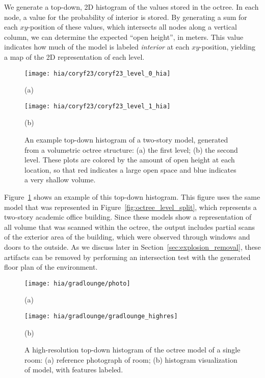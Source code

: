 \documentclass[12pt,onecolumn,oneside]{book}
\begin{document}
We generate a top-down, 2D histogram of the values stored in the octree.  In each node, a value for the probability of interior is stored.  By generating a sum for each $xy$-position of these values, which intersects all nodes along a vertical column, we can determine the expected ``open height'', in meters.  This value indicates how much of the model is labeled {\it interior} at each $xy$-position, yielding a map of the 2D representation of each level.

\begin{figure}

	\centering
	\begin{minipage}[t]{0.49\linewidth}
		\centerline{\texttt{[image: hia/coryf23/coryf23\_level\_0\_hia]}}
		\centerline{(a)}
	\end{minipage}
	\hfill
	\begin{minipage}[t]{0.49\linewidth}
		\centerline{\texttt{[image: hia/coryf23/coryf23\_level\_1\_hia]}}
		\centerline{(b)}
	\end{minipage}

	\caption[Top-down histogram of two-story octree model.]{An example top-down histogram of a two-story model, generated from a volumetric octree structure: (a) the first level; (b) the second level.  These plots are colored by the amount of open height at each location, so that red indicates a large open space and blue indicates a very shallow volume.}
	\label{fig:hia_coryf23}
\end{figure}

Figure~\ref{fig:hia_coryf23} shows an example of this top-down histogram.  This figure uses the same model that was represented in Figure~\ref{fig:octree_level_split}, which represents a two-story academic office building.  Since these models show a representation of all volume that was scanned within the octree, the output includes partial scans of the exterior area of the building, which were observed through windows and doors to the outside.  As we discuss later in Section~\ref{sec:explosion_removal}, these artifacts can be removed by performing an intersection test with the generated floor plan of the environment.

\begin{figure}

	\centering
	\begin{minipage}[t]{0.55\linewidth}
		\centerline{\texttt{[image: hia/gradlounge/photo]}}
		\centerline{(a)}
	\end{minipage}
	\hfill
	\begin{minipage}[t]{0.35\linewidth}
		\centerline{\texttt{[image: hia/gradlounge/gradlounge\_highres]}}
		\centerline{(b)}
	\end{minipage}

	\caption[Top-down histogram of single room.]{A high-resolution top-down histogram of the octree model of a single room:  (a) reference photograph of room; (b) histogram visualization of model, with features labeled.}
	\label{fig:hia_gradlounge}
\end{figure}
\end{document}
